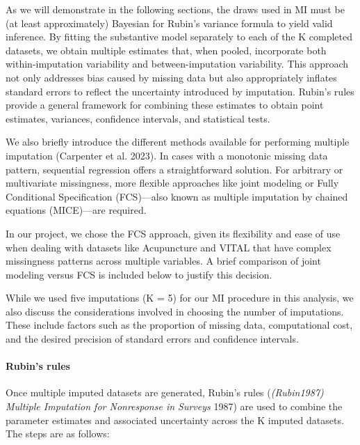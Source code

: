 \documentclass{article}
\begin{document}
As we will demonstrate in the following sections, the draws used in MI
must be (at least approximately) Bayesian for Rubin's variance formula
to yield valid inference. By fitting the substantive model separately to
each of the K completed datasets, we obtain multiple estimates that,
when pooled, incorporate both within-imputation variability and
between-imputation variability. This approach not only addresses bias
caused by missing data but also appropriately inflates standard errors
to reflect the uncertainty introduced by imputation. Rubin's rules
provide a general framework for combining these estimates to obtain
point estimates, variances, confidence intervals, and statistical tests.

We also briefly introduce the different methods available for performing
multiple imputation (Carpenter et al. 2023). In cases with a monotonic
missing data pattern, sequential regression offers a straightforward
solution. For arbitrary or multivariate missingness, more flexible
approaches like joint modeling or Fully Conditional Specification
(FCS)---also known as multiple imputation by chained equations
(MICE)---are required.

In our project, we chose the FCS approach, given its flexibility and
ease of use when dealing with datasets like Acupuncture and VITAL that
have complex missingness patterns across multiple variables. A brief
comparison of joint modeling versus FCS is included below to justify
this decision.

While we used five imputations (K = 5) for our MI procedure in this
analysis, we also discuss the considerations involved in choosing the
number of imputations. These include factors such as the proportion of
missing data, computational cost, and the desired precision of standard
errors and confidence intervals.

\paragraph{Rubin's rules}\label{rubins-rules}

Once multiple imputed datasets are generated, Rubin's rules
(\emph{(Rubin1987) Multiple Imputation for Nonresponse in Surveys} 1987)
are used to combine the parameter estimates and associated uncertainty
across the K imputed datasets. The steps are as follows:
\end{document}

